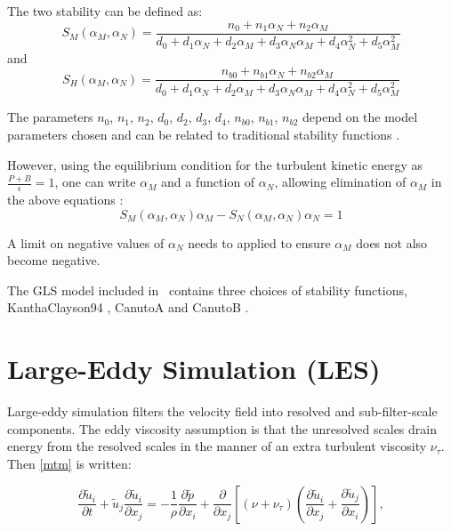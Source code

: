 The two stability can be defined as:
\begin{equation*}
S_M(\alpha_M,\alpha_N) = \frac{n_0+n_1\alpha_N+n_2\alpha_M}{d_0+d_1\alpha_N+d_2\alpha_M+d_3\alpha_N\alpha_M+d_4\alpha_N^2+d_5\alpha_M^2}
\end{equation*}
and
\begin{equation*}
S_H(\alpha_M,\alpha_N) = \frac{n_{b0}+n_{b1}\alpha_N+n_{b2}\alpha_M}{d_0+d_1\alpha_N+d_2\alpha_M+d_3\alpha_N\alpha_M+d_4\alpha_N^2+d_5\alpha_M^2}
\end{equation*}

The parameters $n_0$, $n_1$, $n_2$, $d_0$, $d_2$, $d_3$, $d_4$, $n_{b0}$, $n_{b1}$, $n_{b2}$ depend on the model parameters chosen
and can be related to traditional stability functions \citep{umlauf2005}.

However, using the equilibrium condition for the turbulent kinetic energy as $\frac{P+B}{\epsilon}=1$, one can write
$\alpha_M$ and a function of $\alpha_N$, allowing elimination of $\alpha_M$ in the above equations \citep{umlauf2005}:
\begin{equation*}
S_M(\alpha_M,\alpha_N)\alpha_M - S_N(\alpha_M,\alpha_N)\alpha_N=1
\end{equation*}

A limit on negative values of $\alpha_N$ needs to applied to ensure $\alpha_M$ does not also become negative. 

The GLS model included in \fluidity\ contains three choices of stability functions, KanthaClayson94 \citep{kantha1994}, CanutoA and CanutoB \citep{canuto2001}.

\section{Large-Eddy Simulation (LES)}

Large-eddy simulation filters the velocity field into resolved and sub-filter-scale components. The eddy viscosity assumption is that the unresolved scales drain energy from the resolved scales in the manner of an extra turbulent viscosity $\nu_\tau$. Then \eqref{mtm} is written:

\begin{equation}
\frac{\partial \tilde u_i}{\partial t} + \tilde u_j \frac{\partial \tilde u_i}{\partial x_j}
 = -\frac 1 \rho \frac{\partial \tilde p}{\partial x_i}
 + \frac{\partial}{\partial x_j} \left [ (\nu + \nu_\tau) \left ( \frac{\partial \tilde u_i}{\partial x_j} + \frac{\partial \tilde u_j}{\partial x_i} \right ) \right ],
\end{equation}

